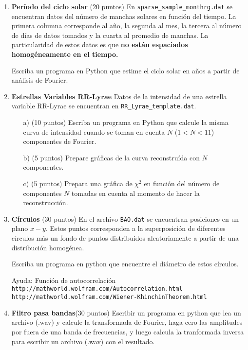 \documentclass{article}
\begin{document}
\begin{enumerate}
\item
{\bf Per\'iodo del ciclo solar} (20 puntos)
En \verb"sparse_sample_monthrg.dat" se encuentran datos del n\'umero
de manchas solares en funci\'on del tiempo. La primera columna
corresponde al a\~no, la segunda al mes, la tercera al n\'umero de
d\'ias de datos tomados y la cuarta al promedio de manchas. La
particularidad de estos datos es que {\bf no est\'an espaciados
  homog\'eneamente en el tiempo.} 

Escriba un programa en Python que estime el ciclo solar en a\~nos a
partir de an\'alisis de Fourier.


\item
{\bf Estrellas Variables RR-Lyrae}
Datos de la intensidad de una estrella variable RR-Lyrae se encuentran
en \verb"RR_Lyrae_template.dat". 

\begin{itemize}
\item[a)] (10 puntos) Escriba un programa en Python que calcule la
  misma curva de intensidad cuando se toman en cuenta $N$ ($1<N<11$)
  componentes de Fourier. 
\item[b)] (5 puntos) Prepare gr\'aficas de la curva reconstru\'ida con $N$
componentes.  
\item[c)] (5 puntos)
Prepara una gr\'afica de $\chi^2$ en funci\'on del n\'umero de
componentes $N$ tomadas en cuenta al momento de hacer la
reconstrucci\'on.   
\end{itemize}

\item

{\bf C\'irculos} (30 puntos)
En el archivo \verb"BAO.dat" se encuentran posiciones en un plano
$x-y$. Estos puntos corresponden a la superposici\'on de diferentes
c\'irculos m\'as un fondo de puntos distribuidos aleatoriamente a
partir de una distribuci\'on homog\'enea. 

Escriba un programa en python que encuentre el di\'ametro de estos
c\'irculos. 

Ayuda:
Funci\'on de autocorrelaci\'on \\ 
\verb"http://mathworld.wolfram.com/Autocorrelation.html"\\
\verb"http://mathworld.wolfram.com/Wiener-KhinchinTheorem.html"

\item {\bf Filtro pasa bandas}(30 puntos) 
Escribir un programa en python que lea un archivo (.wav) y
  calcule la transformada de Fourier, haga cero las amplitudes por fuera de una
banda de frecuencias, y luego calcula la tranformada inversa para escribir
un archivo (.wav) con el resultado.



\end{enumerate}
\end{document}
